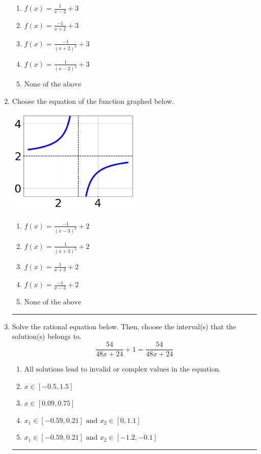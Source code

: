 \documentclass[14pt]{extbook}
\newcommand{\litem}[1]{\item#1\hspace*{-1cm}\rule{\textwidth}{0.4pt}}
\begin{document}
\begin{enumerate}
{\begin{center}
\end{center}
\begin{enumerate}[label=\Alph*.]
\item \( f(x) = \frac{1}{x - 2} + 3 \)
\item \( f(x) = \frac{-1}{x + 2} + 3 \)
\item \( f(x) = \frac{-1}{(x + 2)^2} + 3 \)
\item \( f(x) = \frac{1}{(x - 2)^2} + 3 \)
\item \( \text{None of the above} \)

\end{enumerate} }
\litem{
Choose the equation of the function graphed below.
\begin{center}
    \includegraphics[width=0.5\textwidth]{../Figures/rationalGraphToEquationA.png}
\end{center}
\begin{enumerate}[label=\Alph*.]
\item \( f(x) = \frac{-1}{(x - 3)^2} + 2 \)
\item \( f(x) = \frac{1}{(x + 3)^2} + 2 \)
\item \( f(x) = \frac{1}{x + 3} + 2 \)
\item \( f(x) = \frac{-1}{x - 3} + 2 \)
\item \( \text{None of the above} \)

\end{enumerate} }
\litem{
Solve the rational equation below. Then, choose the interval(s) that the solution(s) belongs to.\[ \frac{54}{48x + 24} + 1 = \frac{54}{48x + 24} \]\begin{enumerate}[label=\Alph*.]
\item \( \text{All solutions lead to invalid or complex values in the equation.} \)
\item \( x \in [-0.5,1.5] \)
\item \( x \in [0.09,0.75] \)
\item \( x_1 \in [-0.59, 0.21] \text{ and } x_2 \in [0,1.1] \)
\item \( x_1 \in [-0.59, 0.21] \text{ and } x_2 \in [-1.2,-0.1] \)


\end{enumerate}}
\end{enumerate}
\end{document}

